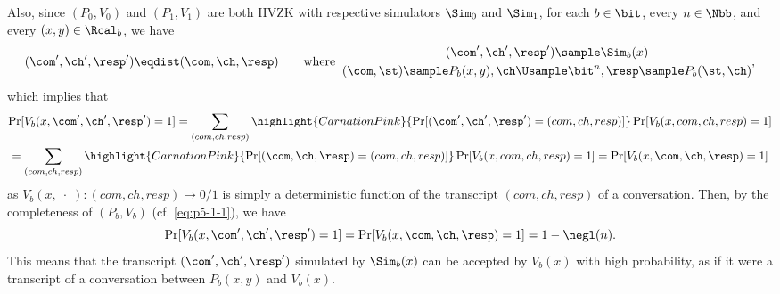 \begin{answer}
    Also, since $(P_0, V_0)$ and $(P_1, V_1)$ are both HVZK with respective simulators $\Sim_0$ and $\Sim_1$, for each $b\in\bit$, every $n\in\Nbb$, and every $(x, y)\in \Rcal_b$, we have
    \[
        (\com', \ch', \resp') \eqdist (\com, \ch, \resp)
        \qquad
        \textrm{where}
        \;\;
        \begin{gathered}
            (\com', \ch', \resp')\sample \Sim_b(x) \\
             (\com, \st)\sample P_b(x, y), \ch \Usample \bit^n, \resp \sample  P_b(\st, \ch)
        \end{gathered},
    \]
    which implies that
    \begin{multline*}
        \Pr[V_b(x, \com', \ch', \resp')=1] 
        = \sum_{(com, ch, resp)} \highlight{CarnationPink}{\Pr[(\com', \ch', \resp') = (com, ch, resp)]} \Pr[V_b(x, com, ch, resp)=1] \\
        = \sum_{(com, ch, resp)} \highlight{CarnationPink}{\Pr[(\com, \ch, \resp) = (com, ch, resp)]} \Pr[V_b(x, com, ch, resp)=1] 
        = \Pr[V_b(x, \com, \ch, \resp)=1] 
    \end{multline*}
    as $V_b(x, \;\cdot\;): (com, ch, resp)\mapsto 0/1$ is simply a deterministic function of the transcript $(com, ch, resp)$ of  a conversation.
    Then, by the completeness of $(P_b, V_b)$ (cf. \eqref{eq:p5-1-1}), we have
    \begin{equation}\label{eq:p5-1-2}
        \Pr[V_b(x, \com', \ch', \resp')=1]=
        \Pr[V_b(x, \com, \ch, \resp)=1]=1-\negl(n).
    \end{equation}
    This means that the  transcript $(\com', \ch', \resp')$ simulated by $\Sim_b(x)$ can be accepted by $V_b(x)$ with high probability, as if it were a transcript of a conversation between $P_b(x, y)$ and $V_b(x)$.
    

\end{answer}
